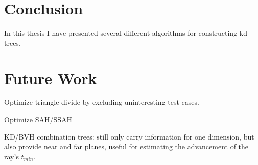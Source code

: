 




\chapter{Conclusion}



In this thesis I have presented several different algorithms for constructing
kd-trees.







\chapter{Future Work}\label{chp:future}


Optimize triangle divide by excluding uninteresting test cases.

Optimize SAH/SSAH

KD/BVH combination trees: still only carry information for one
dimension, but also provide near and far planes, useful for estimating
the advancement of the ray's $t_{min}$.
